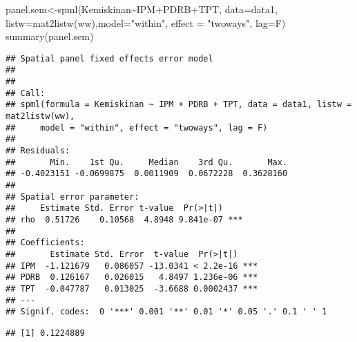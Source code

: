 \documentclass[
]{book}
\newenvironment{Shaded}{\begin{snugshade}}{\end{snugshade}}
\newcommand{\AttributeTok}[1]{\textcolor[rgb]{0.77,0.63,0.00}{#1}}
\newcommand{\DecValTok}[1]{\textcolor[rgb]{0.00,0.00,0.81}{#1}}
\newcommand{\DocumentationTok}[1]{\textcolor[rgb]{0.56,0.35,0.01}{\textbf{\textit{#1}}}}
\newcommand{\FunctionTok}[1]{\textcolor[rgb]{0.00,0.00,0.00}{#1}}
\newcommand{\NormalTok}[1]{#1}
\newcommand{\OtherTok}[1]{\textcolor[rgb]{0.56,0.35,0.01}{#1}}
\newcommand{\SpecialCharTok}[1]{\textcolor[rgb]{0.00,0.00,0.00}{#1}}
\newcommand{\StringTok}[1]{\textcolor[rgb]{0.31,0.60,0.02}{#1}}
\begin{document}
\begin{Shaded}
\begin{Highlighting}[]
\NormalTok{panel.sem}\OtherTok{\textless{}{-}}\FunctionTok{spml}\NormalTok{(Kemiskinan}\SpecialCharTok{\textasciitilde{}}\NormalTok{IPM}\SpecialCharTok{+}\NormalTok{PDRB}\SpecialCharTok{+}\NormalTok{TPT, }\AttributeTok{data=}\NormalTok{data1, }\AttributeTok{listw=}\FunctionTok{mat2listw}\NormalTok{(ww),}\AttributeTok{model=}\StringTok{"within"}\NormalTok{, }
                \AttributeTok{effect =} \StringTok{"twoways"}\NormalTok{, }\AttributeTok{lag=}\NormalTok{F)}
\FunctionTok{summary}\NormalTok{(panel.sem)}
\end{Highlighting}
\end{Shaded}

\begin{verbatim}
## Spatial panel fixed effects error model
##  
## 
## Call:
## spml(formula = Kemiskinan ~ IPM + PDRB + TPT, data = data1, listw = mat2listw(ww), 
##     model = "within", effect = "twoways", lag = F)
## 
## Residuals:
##       Min.    1st Qu.     Median    3rd Qu.       Max. 
## -0.4023151 -0.0699875  0.0011909  0.0672228  0.3628160 
## 
## Spatial error parameter:
##     Estimate Std. Error t-value  Pr(>|t|)    
## rho  0.51726    0.10568  4.8948 9.841e-07 ***
## 
## Coefficients:
##       Estimate Std. Error  t-value  Pr(>|t|)    
## IPM  -1.121679   0.086057 -13.0341 < 2.2e-16 ***
## PDRB  0.126167   0.026015   4.8497 1.236e-06 ***
## TPT  -0.047787   0.013025  -3.6688 0.0002437 ***
## ---
## Signif. codes:  0 '***' 0.001 '**' 0.01 '*' 0.05 '.' 0.1 ' ' 1
\end{verbatim}

\begin{Shaded}
\end{Shaded}

\begin{verbatim}
## [1] 0.1224889
\end{verbatim}

\begin{Shaded}
\end{Shaded}
\end{document}
